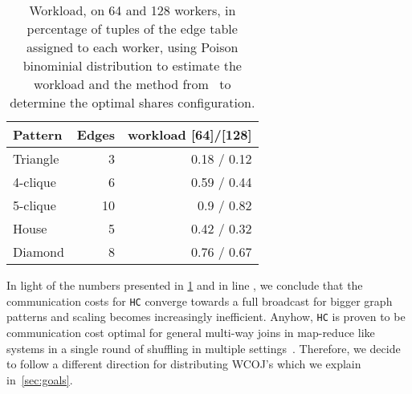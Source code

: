 \begin{table}[t]
\centering
\begin{tabular}{lrr}
\toprule
Pattern  & Edges  & workload [64]/[128] \\ \midrule
Triangle & 3                 & 0.18 / 0.12    \\
4-clique & 6                 & 0.59 / 0.44    \\
5-clique & 10                & 0.9  / 0.82    \\
House    & 5                 & 0.42 / 0.32    \\
Diamond  & 8                 & 0.76 / 0.67    \\
\bottomrule
\end{tabular}
\caption{Workload, on 64 and 128 workers, in percentage of tuples of the edge table assigned to each worker, using Poison binominial distribution to estimate the workload and the method from~\cite{myria-detailed} to determine the optimal shares configuration.}
\label{table:workload}
\end{table}

In light of the numbers presented in \cref{table:workload} and in line \cite{ammar2018distributed}, we conclude that the communication costs for \texttt{HC} converge towards a full broadcast for bigger graph patterns and scaling becomes increasingly inefficient.
Anyhow, \texttt{HC} is proven to be communication cost optimal for general multi-way joins in map-reduce like systems in a single round of shuffling in multiple settings~\cite{beame2013,beame2014,beame2016}.
Therefore, we decide to follow a different direction for distributing WCOJ's which we explain in~\cref{sec:goals}.






